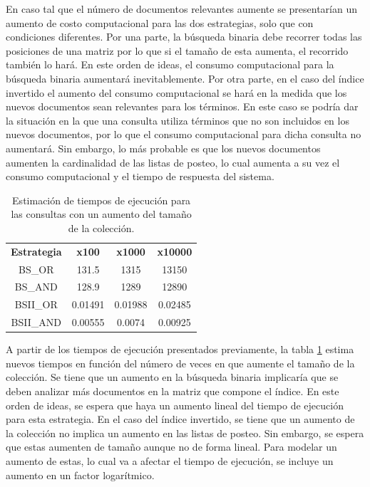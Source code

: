 En caso tal que el número de documentos relevantes aumente se presentarían un aumento de costo computacional para las dos estrategias, solo que con condiciones diferentes. Por una parte, la búsqueda binaria debe recorrer todas las posiciones de una matriz por lo que si el tamaño de esta aumenta, el recorrido también lo hará. En este orden de ideas, el consumo computacional para la búsqueda binaria aumentará inevitablemente. Por otra parte, en el caso del índice invertido el aumento del consumo computacional se hará en la medida que los nuevos documentos sean relevantes para los términos. En este caso se podría dar la situación en la que una consulta utiliza términos que no son incluidos en los nuevos documentos, por lo que el consumo computacional para dicha consulta no aumentará. Sin embargo, lo más probable es que los nuevos documentos aumenten la cardinalidad de las listas de posteo, lo cual aumenta a su vez el consumo computacional y el tiempo de respuesta del sistema.

\begin{table}[h]
    \centering
    \begin{tabular}{|c|c|c|c|}
        \textbf{Estrategia} & \textbf{x100} & \textbf{x1000} & \textbf{x10000} \\
        BS\_OR & 131.5 & 1315 & 13150 \\
        BS\_AND & 128.9 & 1289 & 12890 \\
        BSII\_OR & 0.01491 & 0.01988 & 0.02485 \\
        BSII\_AND & 0.00555 & 0.0074 & 0.00925 \\
    \end{tabular}
    \caption{Estimación de tiempos de ejecución para las consultas con un aumento del tamaño de la colección.}
    \label{tab:estimations}
\end{table}

A partir de los tiempos de ejecución presentados previamente, la tabla \ref{tab:estimations} estima nuevos tiempos en función del número de veces en que aumente el tamaño de la colección. Se tiene que un aumento en la búsqueda binaria implicaría que se deben analizar más documentos en la matriz que compone el índice. En este orden de ideas, se espera que haya un aumento lineal del tiempo de ejecución para esta estrategia. En el caso del índice invertido, se tiene que un aumento de la colección no implica un aumento en las listas de posteo. Sin embargo, se espera que estas aumenten de tamaño aunque no de forma lineal. Para modelar un aumento de estas, lo cual va a afectar el tiempo de ejecución, se incluye un aumento en un factor logarítmico. 

